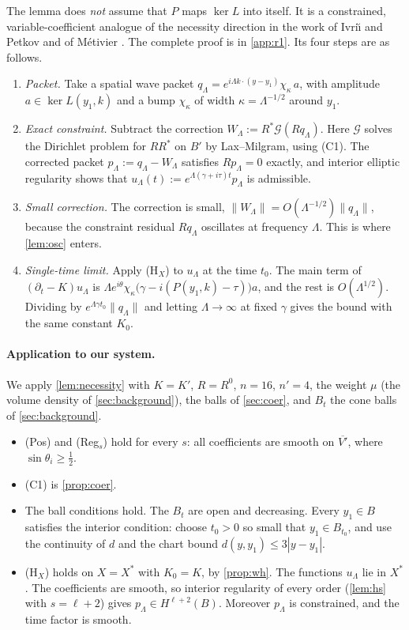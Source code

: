 \documentclass[11pt]{article}
\theoremstyle{plain}
\theoremstyle{definition}
\theoremstyle{remark}
\begin{document}
The lemma does \emph{not} assume that $P$ maps $\ker L$ into itself. It is a constrained, variable-coefficient analogue of the necessity direction in the work of Ivri\u{\i} and Petkov \citep{IvriiPetkov1974} and of Métivier \citep{Metivier2014}. The complete proof is in \cref{app:r1}. Its four steps are as follows.
\begin{enumerate}
  \item \emph{Packet.} Take a spatial wave packet $q_\Lambda = e^{i\Lambda k\cdot(y-y_1)}\chi_\kappa\,a$, with amplitude $a \in \ker L(y_1,k)$ and a bump $\chi_\kappa$ of width $\kappa = \Lambda^{-1/2}$ around $y_1$.
  \item \emph{Exact constraint.} Subtract the correction $W_\Lambda := R^*\mathcal{G}(Rq_\Lambda)$. Here $\mathcal G$ solves the Dirichlet problem for $RR^*$ on $B'$ by Lax--Milgram, using (C1). The corrected packet $p_\Lambda := q_\Lambda - W_\Lambda$ satisfies $Rp_\Lambda = 0$ exactly, and interior elliptic regularity shows that $u_\Lambda(t) := e^{\Lambda(\gamma+i\tau)t}p_\Lambda$ is admissible.
  \item \emph{Small correction.} The correction is small, $\|W_\Lambda\| = O(\Lambda^{-1/2})\|q_\Lambda\|$, because the constraint residual $Rq_\Lambda$ oscillates at frequency $\Lambda$. This is where \cref{lem:osc} enters.
  \item \emph{Single-time limit.} Apply (H$_X$) to $u_\Lambda$ at the time $t_0$. The main term of $(\partial_t - K)u_\Lambda$ is $\Lambda e^{i\theta}\chi_\kappa\bigl(\gamma - i(P(y_1,k) - \tau)\bigr)a$, and the rest is $O(\Lambda^{1/2})$. Dividing by $e^{\Lambda\gamma t_0}\|q_\Lambda\|$ and letting $\Lambda \to \infty$ at fixed $\gamma$ gives the bound with the same constant $K_0$.
\end{enumerate}

\paragraph{Application to our system.}
We apply \cref{lem:necessity} with $K = K'$, $R = R^0$, $n = 16$, $n' = 4$, the weight $\mu$ (the volume density of \cref{sec:background}), the balls of \cref{sec:coer}, and $B_t$ the cone balls of \cref{sec:background}.
\begin{itemize}
  \item (Pos) and (Reg$_s$) hold for every $s$: all coefficients are smooth on $\overline{V'}$, where $\sin\theta_i \ge \tfrac12$.
  \item (C1) is \cref{prop:coer}.
  \item The ball conditions hold. The $B_t$ are open and decreasing. Every $y_1 \in B$ satisfies the interior condition: choose $t_0 > 0$ so small that $y_1 \in B_{t_0}$, and use the continuity of $d$ and the chart bound $d(y,y_1) \le 3|y - y_1|$.
  \item (H$_X$) holds on $X = X^*$ with $K_0 = K$, by \cref{prop:wh}. The functions $u_\Lambda$ lie in $X^*$. The coefficients are smooth, so interior regularity of every order (\cref{lem:hs} with $s = \ell + 2$) gives $p_\Lambda \in H^{\ell+2}(B)$. Moreover $p_\Lambda$ is constrained, and the time factor is smooth.
\end{itemize}
\end{document}
